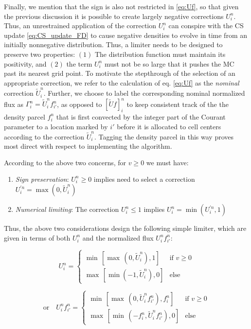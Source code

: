 \documentclass[11pt,titlepage]{report}
\begin{document}
Finally, we mention that the sign is also not restricted in \eqref{eq:Uf}, so that given the previous discussion it is possible to create largely negative corrections $U_i^n$. Thus, an unrestrained application of the correction $U_i^n$ can conspire with the CS update \eqref{eq:CS_update_FD} to cause negative densities to evolve in time from an initially nonnegative distribution. Thus, a limiter needs to be designed to preserve two properties: $(1)$ The distribution function must maintain its positivity, and $(2)$ the term $U_i^n$ must not be so large that it pushes the MC past its nearest grid point. To motivate the stepthrough of the selection of an appropriate correction, we refer to the calculation of eq. \eqref{eq:Uf} as the \emph{nominal} correction $\tilde{U}_i^n$. Further, we choose to label the corresponding nominal normalized flux as $\Gamma_i^n = \tilde{U}_i^nf_{i'}^n$, as opposed to $[\tilde{U}f]_i^n$ to keep consistent track of the the density parcel $f_i^n$ that is first convected by the integer part of the Courant parameter to a location marked by $i'$ before it is allocated to cell centers according to the correction $\tilde{U}_i^n$. Tagging the density parcel in this way proves most direct with respect to implementing the algorithm.

According to the above two concerns, for $v \geq 0$ we must have:


\begin{enumerate}
\item \emph{Sign preservation}: $U_i^{n} \geq 0$ implies need to select a correction $U_i^{'n} = \max (0,\tilde{U}_i^n)$
\item \emph{Numerical limiting}: The correction $U_i^n \leq 1$ implies $U_i^n = \min (U_i^{'n},1)$
\end{enumerate}

\noindent Thus, the above two considerations design the following simple limiter, which are given in terms of both $U_i^n$ and the normalized flux $U_i^nf_{i'}^n$: \\[0.5em]

\noindent\noindent\begin{minipage}{0.45\textwidth}
\vspace{1em}$$U_i^n =
  \begin{cases}
    \min\, [ \max \,(0,\tilde{U}_i^n), 1]  & \text{if } v \geq 0 \\[1em]
    \max\, [ \min (-1,\tilde{U}_i^n), 0]       & \text{else}
  \end{cases}$$
\end{minipage}
\begin{minipage}{0.55\textwidth}
\begin{equation}\text{or }\,\,\,\,U_i^nf_{i'}^n =
  \begin{cases}
    \min \,[\max \,(0,\tilde{U}_i^nf_{i'}^n), f_i^n]  & \text{if } v \geq 0 \\[1em]
    \max \,[\min \,(-f_i^n, \tilde{U}_i^nf_{i'}^n), 0]    & \text{else}
  \end{cases}\label{eq:Uf_limiter}\end{equation}
\end{minipage}\\[1em]
\end{document}
